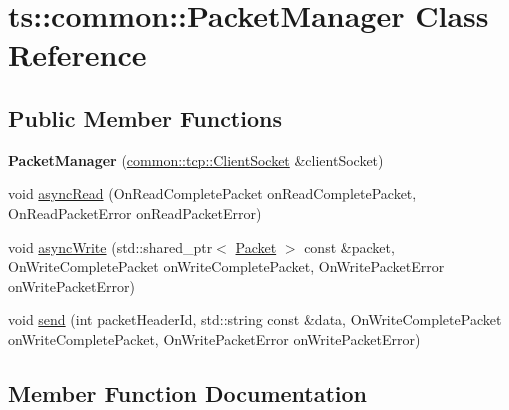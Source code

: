 \hypertarget{classts_1_1common_1_1_packet_manager}{}\section{ts\+:\+:common\+:\+:Packet\+Manager Class Reference}
\label{classts_1_1common_1_1_packet_manager}
\subsection*{Public Member Functions}
\begin{DoxyCompactItemize}
\item 
\mbox{\label{classts_1_1common_1_1_packet_manager_a3b73116e602124697590afecb82ef9fd}} 
{\bfseries Packet\+Manager} (\hyperlink{classts_1_1common_1_1tcp_1_1_client_socket}{common\+::tcp\+::\+Client\+Socket} \&client\+Socket)
\item 
void \hyperlink{classts_1_1common_1_1_packet_manager_a6165799da03af1c119d921ac96a24562}{async\+Read} (On\+Read\+Complete\+Packet on\+Read\+Complete\+Packet, On\+Read\+Packet\+Error on\+Read\+Packet\+Error)
\item 
void \hyperlink{classts_1_1common_1_1_packet_manager_ae308b816f8cf10367f0f63fa5c1fadf4}{async\+Write} (std\+::shared\+\_\+ptr$<$ \hyperlink{structts_1_1common_1_1_packet}{Packet} $>$ const \&packet, On\+Write\+Complete\+Packet on\+Write\+Complete\+Packet, On\+Write\+Packet\+Error on\+Write\+Packet\+Error)
\item 
void \hyperlink{classts_1_1common_1_1_packet_manager_aae446c8e99adc8ead7d4b0cd40545cd0}{send} (int packet\+Header\+Id, std\+::string const \&data, On\+Write\+Complete\+Packet on\+Write\+Complete\+Packet, On\+Write\+Packet\+Error on\+Write\+Packet\+Error)
\end{DoxyCompactItemize}


\subsection{Member Function Documentation}
\mbox{\label{classts_1_1common_1_1_packet_manager_a6165799da03af1c119d921ac96a24562}} 
